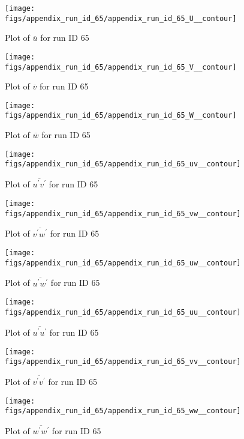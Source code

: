 \begin{figure}[H]
\centering
\texttt{[image: figs/appendix\_run\_id\_65/appendix\_run\_id\_65\_U\_\_contour]}
\caption{Plot of $\overline{u}$ for run ID 65}
\label{fig:appendix_run_id_65_U__contour}
\end{figure}


\begin{figure}[H]
\centering
\texttt{[image: figs/appendix\_run\_id\_65/appendix\_run\_id\_65\_V\_\_contour]}
\caption{Plot of $\overline{v}$ for run ID 65}
\label{fig:appendix_run_id_65_V__contour}
\end{figure}


\begin{figure}[H]
\centering
\texttt{[image: figs/appendix\_run\_id\_65/appendix\_run\_id\_65\_W\_\_contour]}
\caption{Plot of $\overline{w}$ for run ID 65}
\label{fig:appendix_run_id_65_W__contour}
\end{figure}


\begin{figure}[H]
\centering
\texttt{[image: figs/appendix\_run\_id\_65/appendix\_run\_id\_65\_uv\_\_contour]}
\caption{Plot of $\overline{u^\prime v^\prime}$ for run ID 65}
\label{fig:appendix_run_id_65_uv__contour}
\end{figure}


\begin{figure}[H]
\centering
\texttt{[image: figs/appendix\_run\_id\_65/appendix\_run\_id\_65\_vw\_\_contour]}
\caption{Plot of $\overline{v^\prime w^\prime}$ for run ID 65}
\label{fig:appendix_run_id_65_vw__contour}
\end{figure}


\begin{figure}[H]
\centering
\texttt{[image: figs/appendix\_run\_id\_65/appendix\_run\_id\_65\_uw\_\_contour]}
\caption{Plot of $\overline{u^\prime w^\prime}$ for run ID 65}
\label{fig:appendix_run_id_65_uw__contour}
\end{figure}


\begin{figure}[H]
\centering
\texttt{[image: figs/appendix\_run\_id\_65/appendix\_run\_id\_65\_uu\_\_contour]}
\caption{Plot of $\overline{u^\prime u^\prime}$ for run ID 65}
\label{fig:appendix_run_id_65_uu__contour}
\end{figure}


\begin{figure}[H]
\centering
\texttt{[image: figs/appendix\_run\_id\_65/appendix\_run\_id\_65\_vv\_\_contour]}
\caption{Plot of $\overline{v^\prime v^\prime}$ for run ID 65}
\label{fig:appendix_run_id_65_vv__contour}
\end{figure}


\begin{figure}[H]
\centering
\texttt{[image: figs/appendix\_run\_id\_65/appendix\_run\_id\_65\_ww\_\_contour]}
\caption{Plot of $\overline{w^\prime w^\prime}$ for run ID 65}
\label{fig:appendix_run_id_65_ww__contour}
\end{figure}



